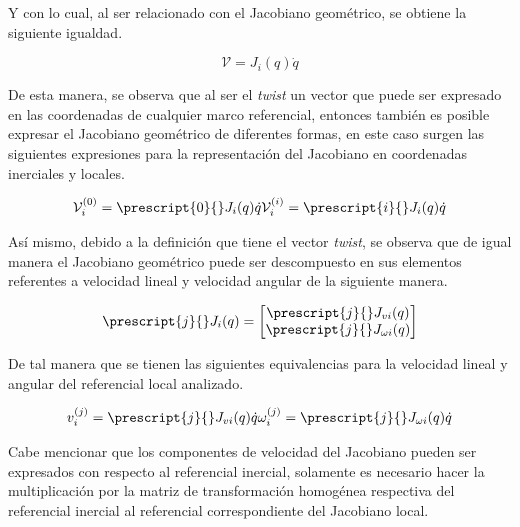        Y con lo cual, al ser relacionado con el Jacobiano geométrico, se obtiene la siguiente 
        igualdad.

        \begin{equation*}
            \mathcal{V} = J_i(q)\dot{q}
        \end{equation*}

        De esta manera, se observa que al ser el \emph{twist} un vector que puede ser expresado 
        en las coordenadas de cualquier marco referencial, entonces también es posible expresar 
        el Jacobiano geométrico de diferentes formas, en este caso surgen las siguientes expresiones 
        para la representación del Jacobiano en coordenadas inerciales y locales.

        \begin{align*}
            \mathcal{V}^{(0)}_i = \prescript{0}{}J_i(q)\dot{q}
            \mathcal{V}^{(i)}_i = \prescript{i}{}J_i(q)\dot{q}
        \end{align*}
        
        Así mismo, debido a la definición que tiene el vector \emph{twist}, se observa que de igual 
        manera el Jacobiano geométrico puede ser descompuesto en sus elementos referentes a velocidad 
        lineal y velocidad angular de la siguiente manera.

        \begin{equation*}
            \prescript{j}{}J_i(q) = 
            \begin{bmatrix}
                \prescript{j}{}J_{vi}(q) \\
                \prescript{j}{}J_{\omega i}(q)
            \end{bmatrix}
        \end{equation*}

        De tal manera que se tienen las siguientes equivalencias para la velocidad lineal y angular del 
        referencial local analizado.

        \begin{align*}
            v^{(j)}_i = \prescript{j}{}J_{vi}(q)\dot{q}
            \omega^{(j)}_i = \prescript{j}{}J_{\omega i}(q)\dot{q}
        \end{align*}

        Cabe mencionar que los componentes de velocidad del Jacobiano pueden ser expresados 
        con respecto al referencial inercial, solamente es necesario hacer la multiplicación 
        por la matriz de transformación homogénea respectiva del referencial inercial al referencial 
        correspondiente del Jacobiano local.

